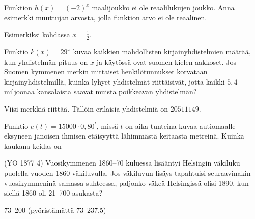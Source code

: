 \begin{tehtavasivu}
\begin{tehtava}
Funktion $ h(x)=(-2)^{x}$ maalijoukko ei ole reaalilukujen joukko. Anna esimerkki muuttujan arvosta, jolla funktion arvo ei ole reaalinen.
\begin{vastaus}
Esimerkiksi kohdassa $x = \frac{1}{2}$.
\end{vastaus}
\end{tehtava}

\begin{tehtava}
Funktio $ k(x)=29^{x}$ kuvaa kaikkien mahdollisten kirjainyhdistelmien määrää, kun yhdistelmän pituus on $ x $ ja käytössä ovat suomen kielen aakkoset. Jos Suomen kymmenen merkin mittaiset henkilötunnukset korvataan kirjainyhdistelmillä, kuinka lyhyet yhdistelmät riittäisivät, jotta kaikki $ 5,4 $ miljoonaa kansalaista saavat muista poikkeavan yhdistelmän?
\begin{vastaus}
Viisi merkkiä riittää. Tällöin erilaisia yhdistelmiä on $20511149$.
\end{vastaus}
\end{tehtava}

\begin{tehtava}
Funktio $ e(t)=15000\cdot 0,80^{t}$, missä $ t $ on aika tunteina kuvaa autiomaalle eksyneen janoisen ihmisen etäisyyttä lähimmästä keitaasta metreinä. Kuinka kaukana keidas on 
\begin{alakohdat}
\end{alakohdat}
\begin{vastaus}
\begin{alakohdat}
\end{alakohdat}
\end{vastaus}
\end{tehtava}

\begin{tehtava}
(YO 1877 4) Vuosikymmenen 1860--70 kuluessa lisääntyi Helsingin väkiluku puolella vuoden 1860 väkiluvulla. Jos väkiluvun lisäys tapahtuisi seuraavinakin vuosikymmeninä samassa suhteessa, paljonko väkeä Helsingissä olisi 1890, kun siellä 1860 oli 21~700 asukasta? 
	\begin{vastaus}
	73~200 (pyöristämättä 73~237,5)
	\end{vastaus}
\end{tehtava}



\end{tehtavasivu}
